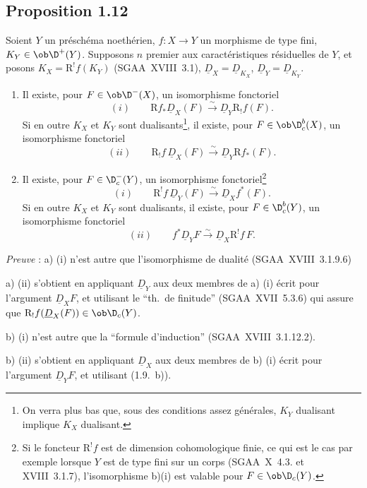 \subsection*{Proposition 1.12}
Soient $Y$ un préschéma noethérien, $f : X \to Y$ un morphisme de type fini, $K_Y \in \ob \D^{+}(Y)$. Supposons $n$ premier aux caractéristiques résiduelles de $Y$, et posons $K_X = \mathrm{R}^{!}f(K_Y)$ (SGAA~XVIII~3.1), $\underline{D}_X = \underline{D}_{K_X}$, $\underline{D}_Y = \underline{D}_{K_Y}$.
\begin{enumerate}
\item[a)] Il existe, pour $F \in \ob \D^{-}(X)$, un isomorphisme fonctoriel
\[
(i) \qquad \mathrm{R} f_{*} \underline{D}_X(F) \xrightarrow{\sim} \underline{D}_Y \mathrm{R}_{!}f(F).
\]
Si en
outre $K_X$ et $K_Y$ sont dualisants\footnote{On verra plus bas que, sous des conditions assez générales, $K_Y$ dualisant implique $K_X$ dualisant.}, il existe, pour $F \in \ob \D_c^{b}(X)$, un isomorphisme fonctoriel
\[
(ii) \qquad \mathrm{R}_{!}f \, \underline{D}_X(F) \xrightarrow{\sim} \underline{D}_Y \mathrm{R} f_{*}(F).
\]
\item[b)] Il existe, pour $F \in \D_c^{-}(Y)$, un isomorphisme fonctoriel\footnote{Si le foncteur $\mathrm{R}^{!}f$ est de dimension cohomologique finie, ce qui est le cas par exemple lorsque $Y$ est de type fini sur un corps (SGAA~X~4.3. et XVIII~3.1.7), l'isomorphisme b)(i) est valable pour $F \in \ob \D_c(Y)$.}
\[
(i) \qquad \mathrm{R}^{!}f \, \underline{D}_Y(F) \xrightarrow{\sim} \underline{D}_X f^{*}(F).
\]
Si en outre $K_X$ et $K_Y$ sont dualisants\footnotemark[3], il existe, pour $F \in \D_c^{b}(Y)$, un isomorphisme fonctoriel
\[
(ii) \qquad f^{*} \underline{D}_Y F \xrightarrow{\sim} \underline{D}_X \mathrm{R}^{!}f \, F.
\]
\end{enumerate}

\emph{Preuve} : a) (i) n'est autre que l'isomorphisme de dualité (SGAA~XVIII~3.1.9.6)

a) (ii) s'obtient en appliquant $\underline{D}_Y$ aux deux membres de a) (i) écrit pour l'argument $\underline{D}_X F$, et utilisant le ``th.~de finitude'' (SGAA~XVII~5.3.6) qui assure que $\mathrm{R}_{!}f(\underline{D}_X(F)) \in \ob \D_c(Y)$.

b) (i) n'est autre que la ``formule d'induction'' (SGAA~XVIII~3.1.12.2).

b) (ii) s'obtient en appliquant $\underline{D}_X$ aux deux membres de b) (i) écrit pour l'argument $\underline{D}_Y F$, et utilisant (1.9.~b)).

